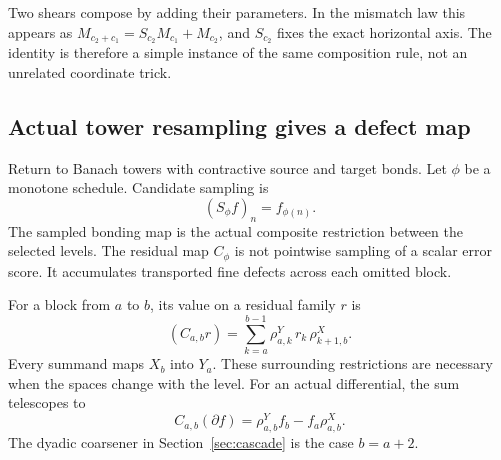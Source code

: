 
Two shears compose by adding their parameters. In the mismatch law this appears as \(M_{c_2+c_1}=S_{c_2}M_{c_1}+M_{c_2}\), and \(S_{c_2}\) fixes the exact horizontal axis. The identity is therefore a simple instance of the same composition rule, not an unrelated coordinate trick.

\subsection{Actual tower resampling gives a defect map}
Return to Banach towers with contractive source and target bonds. Let \(\phi\) be a monotone schedule. Candidate sampling is
\[
 (S_\phi f)_n=f_{\phi(n)}.
\]
The sampled bonding map is the actual composite restriction between the selected levels. The residual map \(C_\phi\) is not pointwise sampling of a scalar error score. It accumulates transported fine defects across each omitted block.

For a block from \(a\) to \(b\), its value on a residual family \(r\) is
\begin{equation}\label{eq:block-defect-sum}
 (C_{a,b}r)=\sum_{k=a}^{b-1}
 \rho^Y_{a,k}\,r_k\,\rho^X_{k+1,b}.
\end{equation}
Every summand maps \(X_b\) into \(Y_a\). These surrounding restrictions are necessary when the spaces change with the level. For an actual differential, the sum telescopes to
\[
 C_{a,b}(\partial f)=\rho^Y_{a,b}f_b-f_a\rho^X_{a,b}.
\]
The dyadic coarsener in Section~\ref{sec:cascade} is the case \(b=a+2\).

